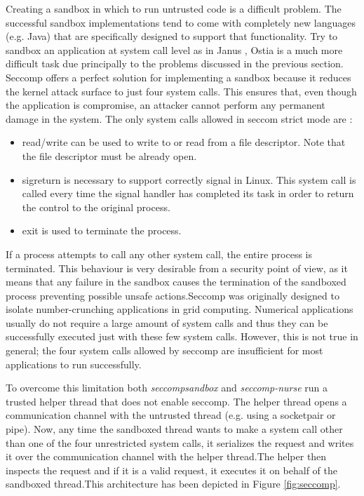 Creating a sandbox in which to run untrusted code is a difficult problem. The successful sandbox implementations tend to come with completely new languages (e.g. Java) that are specifically designed to support that functionality. Try to sandbox an application at system call level as in Janus \cite{Janus}, Ostia \cite{Garfinkel03ostia:a} is a much more difficult task due principally to the problems discussed in the previous section.
Seccomp offers a perfect solution for implementing a sandbox because it reduces the kernel attack surface to just four system calls. This ensures that, even though the application is compromise, an attacker cannot perform any permanent damage in the system. The only system calls allowed in seccom strict mode are : 
\begin{itemize}
\item  read/write can be used to write to or read from a file descriptor. Note that the file descriptor must be already open. 
\item  sigreturn is necessary to support correctly signal in Linux. This system call is called every time the signal handler has completed its task in order to return the control 	   to the original process. 
\item  exit	is used to terminate the process. 
\end{itemize}

If a process attempts to call any other system call, the entire process is terminated. This behaviour is very desirable from a security point of view, as it means that any failure in the sandbox causes the termination of the sandboxed process preventing possible unsafe actions.Seccomp was originally designed to isolate number-crunching applications in grid computing. Numerical applications usually do not require a large amount of system calls and thus they can be successfully executed just with these few system calls. However, this is not true in general; the four system calls allowed by seccomp are insufficient for most applications to run successfully. 

To overcome this limitation both \emph{seccompsandbox} and \emph{seccomp-nurse} run a trusted helper thread that does not enable seccomp. The helper thread opens a communication channel with the untrusted thread (e.g. using a socketpair or pipe). Now, any time the sandboxed thread wants to make a system call other than one of the four unrestricted system calls, it serializes the request and writes it over the communication channel with the helper thread.The helper then inspects the request and if it is a valid request, it executes it  on behalf of the sandboxed thread.This architecture has been depicted in Figure \ref{fig:seccomp}. 

